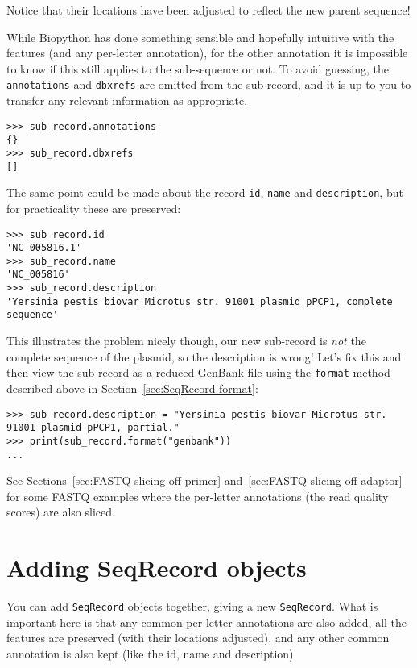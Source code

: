 \noindent Notice that their locations have been adjusted to reflect the new parent sequence!

While Biopython has done something sensible and hopefully intuitive with the features
(and any per-letter annotation), for the other annotation it is impossible to know if
this still applies to the sub-sequence or not. To avoid guessing, the \texttt{annotations}
and \texttt{dbxrefs} are omitted from the sub-record, and it is up to you to transfer
any relevant information as appropriate.

\begin{verbatim}
>>> sub_record.annotations
{}
>>> sub_record.dbxrefs
[]
\end{verbatim}

The same point could be made about the record \texttt{id}, \texttt{name}
and \texttt{description}, but for practicality these are preserved:

\begin{verbatim}
>>> sub_record.id
'NC_005816.1'
>>> sub_record.name
'NC_005816'
>>> sub_record.description
'Yersinia pestis biovar Microtus str. 91001 plasmid pPCP1, complete sequence'
\end{verbatim}

\noindent This illustrates the problem nicely though, our new sub-record is
\emph{not} the complete sequence of the plasmid, so the description is wrong!
Let's fix this and then view the sub-record as a reduced GenBank file using
the \texttt{format} method described above in Section~\ref{sec:SeqRecord-format}:

\begin{verbatim}
>>> sub_record.description = "Yersinia pestis biovar Microtus str. 91001 plasmid pPCP1, partial."
>>> print(sub_record.format("genbank"))
...
\end{verbatim}

See Sections~\ref{sec:FASTQ-slicing-off-primer}
and~\ref{sec:FASTQ-slicing-off-adaptor} for some FASTQ examples where the
per-letter annotations (the read quality scores) are also sliced.

\section{Adding SeqRecord objects}
\label{sec:SeqRecord-addition}

You can add \verb|SeqRecord| objects together, giving a new \verb|SeqRecord|.
What is important here is that any common
per-letter annotations are also added, all the features are preserved (with their
locations adjusted), and any other common annotation is also kept (like the id, name
and description).

